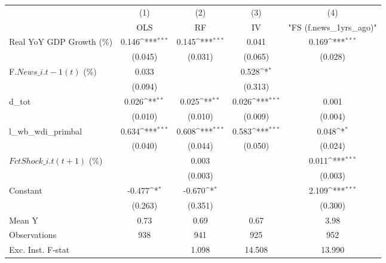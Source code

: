{
\def\sym#1{\ifmmode^{#1}\else\(^{#1}\)\fi}
\begin{tabular}{l*{4}{c}}
\toprule
                    &\multicolumn{1}{c}{(1)}&\multicolumn{1}{c}{(2)}&\multicolumn{1}{c}{(3)}&\multicolumn{1}{c}{(4)}\\
                    &\multicolumn{1}{c}{OLS}&\multicolumn{1}{c}{RF}&\multicolumn{1}{c}{IV}&\multicolumn{1}{c}{ "FS (f.news\_1yrs\_ago)" }\\
\midrule
Real YoY GDP Growth (\%)&       0.146\sym{***}&       0.145\sym{***}&       0.041         &       0.169\sym{***}\\
                    &     (0.045)         &     (0.031)         &     (0.065)         &     (0.028)         \\
\addlinespace
F.$ News\_{i.t-1}(t)$ (\%)&       0.033         &                     &       0.528\sym{*}  &                     \\
                    &     (0.094)         &                     &     (0.313)         &                     \\
\addlinespace
d\_tot               &       0.026\sym{**} &       0.025\sym{**} &       0.026\sym{***}&       0.001         \\
                    &     (0.010)         &     (0.010)         &     (0.009)         &     (0.004)         \\
\addlinespace
l\_wb\_wdi\_primbal    &       0.634\sym{***}&       0.608\sym{***}&       0.583\sym{***}&       0.048\sym{*}  \\
                    &     (0.040)         &     (0.044)         &     (0.050)         &     (0.024)         \\
\addlinespace
$ FctShock\_{i.t}(t+1)$ (\%)&                     &       0.003         &                     &       0.011\sym{***}\\
                    &                     &     (0.003)         &                     &     (0.003)         \\
\addlinespace
Constant            &      -0.477\sym{*}  &      -0.670\sym{*}  &                     &       2.109\sym{***}\\
                    &     (0.263)         &     (0.351)         &                     &     (0.300)         \\
\midrule
Mean Y              &        0.73         &        0.69         &        0.67         &        3.98         \\
Observations        &         938         &         941         &         925         &         952         \\
Exc. Inst. F-stat   &                     &       1.098         &      14.508         &      13.990         \\
\bottomrule
\end{tabular}
}
